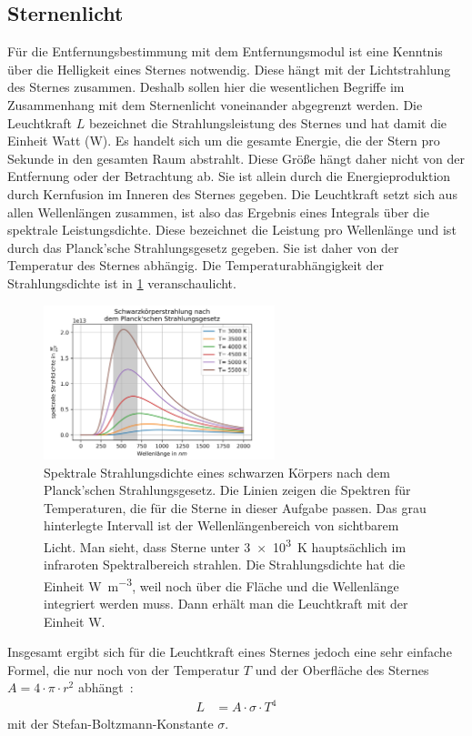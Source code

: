 \subsection{Sternenlicht}
\label{chap:Intensität}
Für die Entfernungsbestimmung mit dem Entfernungsmodul ist eine Kenntnis über die Helligkeit eines Sternes notwendig. Diese hängt mit der Lichtstrahlung des Sternes zusammen. Deshalb sollen hier die wesentlichen Begriffe im Zusammenhang mit dem Sternenlicht voneinander abgegrenzt werden.
Die Leuchtkraft $L$ bezeichnet die Strahlungsleistung des Sternes und hat damit die Einheit Watt (\unit{\watt}). Es handelt sich um die gesamte Energie, die der Stern pro Sekunde in den gesamten Raum abstrahlt. Diese Größe hängt daher nicht von der Entfernung oder der Betrachtung ab. Sie ist allein durch die Energieproduktion durch Kernfusion im Inneren des Sternes gegeben. Die Leuchtkraft setzt sich aus allen Wellenlängen zusammen, ist also das Ergebnis eines Integrals über die spektrale Leistungsdichte. Diese bezeichnet die Leistung pro Wellenlänge und ist durch das Planck'sche Strahlungsgesetz gegeben. Sie ist daher von der Temperatur des Sternes abhängig. Die Temperaturabhängigkeit der Strahlungsdichte ist in \cref{fig:Planck} veranschaulicht.
\begin{figure}
	\centering
	\includegraphics[width= 0.6\textwidth]{Bilder/Planck.jpg}
	\caption{Spektrale Strahlungsdichte eines schwarzen Körpers nach dem Planck'schen Strahlungsgesetz. Die Linien zeigen die Spektren für Temperaturen, die für die Sterne in dieser Aufgabe passen. Das grau hinterlegte Intervall ist der Wellenlängenbereich von sichtbarem Licht. Man sieht, dass Sterne unter \SI{3e3}{\kelvin} hauptsächlich im infraroten Spektralbereich strahlen. Die Strahlungsdichte hat die Einheit \unit{\watt \per \meter \cubed}, weil noch über die Fläche und die Wellenlänge integriert werden muss. Dann erhält man die Leuchtkraft mit der Einheit \unit{\watt}.}
	\label{fig:Planck}
\end{figure}
Insgesamt ergibt sich für die Leuchtkraft eines Sternes jedoch eine sehr einfache Formel, die nur noch von der Temperatur $T$ und der Oberfläche des Sternes $A=4\cdot\pi\cdot r^2$ abhängt~\cite[S.16]{Cornelsen2013}:
\begin{align*}
	L&=A\cdot\sigma\cdot T^4
\end{align*}
mit der Stefan-Boltzmann-Konstante $\sigma$.

